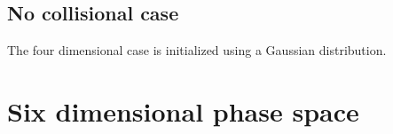 \subsection{No collisional case}
The four dimensional case is initialized using a Gaussian distribution.














\newpage
\section{Six dimensional phase space}










